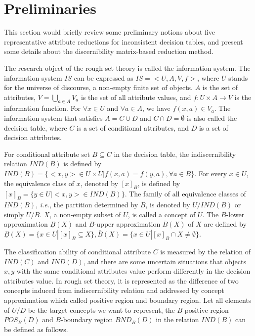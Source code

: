 \documentclass[review]{elsarticle}
\begin{document}
\section{Preliminaries}
	\par This section would briefly review some preliminary notions about five representative attribute reductions for inconsistent decision tables, and present some details about the discernibility matrix-based reduction method.
	\par The research object of the rough set theory is called the information system. The information system $IS$ can be expressed as $IS=<U,A,V,f>$, where $U$ stands for the universe of discourse, a non-empty finite set of objects. $A$ is the set of attributes, $V=\bigcup_{a \in A}V_{a}$ is the set of all attribute values, and $f:U \times A \rightarrow V$ is the information function. For $\forall x \in U$ and $\forall a \in A$, we have $f(x,a) \in V_a$. The information system that satisfies $A=C \cup D$ and $C \cap D = \emptyset$ is also called the decision table, where $C$ is a set of conditional attributes, and $D$ is a set of decision attributes.
	\par For conditional attribute set $B \subseteq C$ in the decision table, the indiscernibility relation $IND(B)$ is defined by $IND(B) = \{<x,y> \in U \times U|f(x,a)=f(y,a), \forall a \in B\}$. For every $x \in U$, the equivalence class of $x$, denoted by $[x]_B$, is defined by $[x]_B = \{ y \in U|<x,y> \in IND(B)\}$. The family of all equivalence classes of $IND(B)$, \emph{i.e.}, the partition determined by $B$, is denoted by $U/IND(B)$ or simply $U/B$. $X$, a non-empty subset of $U$, is called a concept of $U$. The $B$-lower approximation $\underline{B}(X)$ and $B$-upper approximation $\overline{B}(X)$ of $X$ are defined by $\underline{B}(X) = \{x \in U|[x]_B \subseteq X\}, \overline{B}(X) = \{x \in U|[x]_B \cap X \neq \emptyset\}$.
	\par The classification ability of conditional attribute $C$ is measured by the relation of $IND(C)$ and $IND(D)$, and there are some uncertain situations that objects $x,y$ with the same conditional attributes value perform differently in the decision attributes value. In rough set theory, it is represented as the difference of two concepts induced from indiscernibility relation and addressed by concept approximation which called positive region and boundary region. Let all elements of $U/D$ be the target concepts we want to represent, the $B$-positive region $POS_B(D)$ and $B$-boundary region $BND_B(D)$ in the relation $IND(B)$ can be defined as follows.
\end{document}
